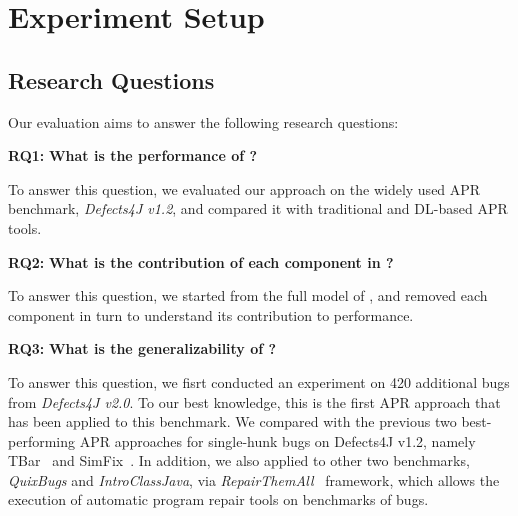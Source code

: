 \section{Experiment Setup}

\subsection{Research Questions}
Our evaluation aims to answer the following research questions:

\noindent
    \textbf{RQ1:} \textbf{What is the performance of \techname?}

To answer this question, we evaluated our approach on the widely used APR benchmark, \textit{Defects4J v1.2}, and compared it with traditional and DL-based APR tools.

\noindent
    \textbf{RQ2:} \textbf{What is the contribution of each component in \techname?}
 
 To answer this question, we started from the full model of \techname, and removed each component in turn to understand its contribution to performance. 
 
 
\noindent
\textbf{RQ3:} \textbf{What is the generalizability of \techname?}
 
 To answer this question, we fisrt conducted an experiment on 420 additional bugs from \textit{Defects4J v2.0}. To our best knowledge, this is the first APR approach that has been applied to this benchmark. We compared \techname with the previous two best-performing APR approaches for single-hunk bugs on Defects4J v1.2, namely TBar~\cite{liu2019tbar} and SimFix~\cite{2018Shaping}. In addition, we also applied \techname to other two benchmarks, \textit{QuixBugs} and \textit{IntroClassJava}, via \textit{RepairThemAll}~\cite{RepairThemAll2019} framework, which allows the execution of automatic program repair tools on benchmarks of bugs.
 
    
    

